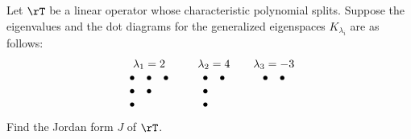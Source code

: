 \begin{exercises}
\exstart Let $\rT$ be a linear operator whose characteristic polynomial splits. Suppose the eigenvalues and the dot diagrams for the generalized eigenspaces $K_{\lambda_i}$ are as follows:
  \[\begin{array}{c@{\qquad}c@{\qquad}c}
  \lambda_1=2&\lambda_2=4&\lambda_3=-3\\
  \begin{array}{ccc}
  \bullet&\bullet&\bullet\\
  \bullet&\bullet&\\
  \bullet&&
  \end{array}
  &
  \begin{array}{cc}
  \bullet&\bullet\\
  \bullet&\\
  \bullet&
  \end{array}
  &
  \begin{array}{cc}
  \bullet&\bullet\\
  &\\
  &
  \end{array}
  \end{array}\]
  Find the Jordan form $J$ of $\rT$.
  

\end{exercises}
